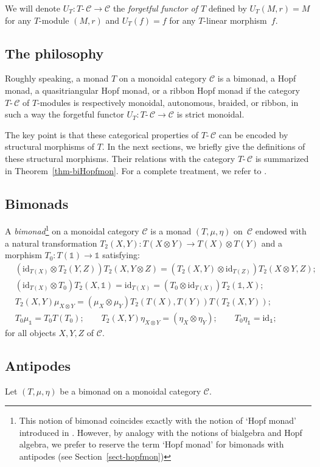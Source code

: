 \documentclass[a4paper]{amsart}
\theoremstyle{definition}
\newcommand{\co}{\colon}
\newcommand{\id}{\mathrm{id}}
\newcommand{\cc}{\mathcal{C}}
\newcommand{\ti}{\mbox{-}\,}
\newcommand{\un}{\mathbb{1}}
\begin{document}
We will denote $U_T\co T\ti\cc \to \cc$ the \emph{forgetful functor of $T$} defined by $U_T(M,r)=M$  for any $T$-module
$(M,r)$ and $U_T(f)=f$ for any $T$-linear morphism~$f$.

\subsection{The philosophy}
Roughly speaking, a monad $T$ on a monoidal category $\cc$ is a bimonad, a Hopf monad, a quasitriangular Hopf monad, or a
ribbon Hopf monad if the category $T\ti\cc$ of $T$-modules is respectively monoidal, autonomous, braided, or ribbon, in such
a way the forgetful functor $U_T \co T\ti\cc \to \cc$ is strict monoidal.

The key point is that these categorical properties of $T\ti\cc$ can be encoded by structural morphisms of $T$. In the next
sections, we briefly give the definitions of these structural morphisms. Their relations with the category $T\ti\cc$ is
summarized in Theorem~\ref{thm-biHopfmon}. For a complete treatment, we refer to \cite{BV2}.

\subsection{Bimonads}
A \emph{bimonad}\footnote{This notion of bimonad coincides exactly with the notion of `Hopf monad' introduced in
\cite{Moer}. However, by analogy with the notions  of bialgebra and Hopf algebra, we prefer to reserve the term `Hopf monad'
for bimonads with antipodes (see Section~\ref{sect-hopfmon})} on a monoidal category $\cc$ is a monad $(T,\mu,\eta)$
on~$\cc$ endowed with a natural transformation $ T_2(X,Y)\co T(X \otimes Y) \to T(X) \otimes T(Y)$ and a morphism $T_0 \co
T(\un) \to \un$ satisfying:
\begin{align*}
& (\id_{T(X)} \otimes T_2(Y,Z))  T_2(X,Y \otimes Z)= (T_2(X,Y) \otimes \id_{T(Z)}) T_2(X \otimes Y, Z);\\
& (\id_{T(X)} \otimes T_0) T_2(X,\un)=\id_{T(X)}=(T_0 \otimes \id_{T(X)}) T_2(\un,X); \\
& T_2(X,Y) \mu_{X \otimes Y}= (\mu_X \otimes \mu_Y) T_2(T(X),T(Y)) T(T_2(X,Y)) ;\\
& T_0 \mu_\un= T_0 T(T_0); \qquad T_2(X,Y) \eta_{X \otimes Y}= (\eta_X \otimes \eta_Y); \qquad  T_0 \eta_\un= \id_\un;
\end{align*}
for all objects $X,Y,Z$ of $\cc$.

\subsection{Antipodes}\label{sect-antipod}
Let $(T,\mu,\eta)$ be a bimonad on a monoidal category $\cc$.
\end{document}
